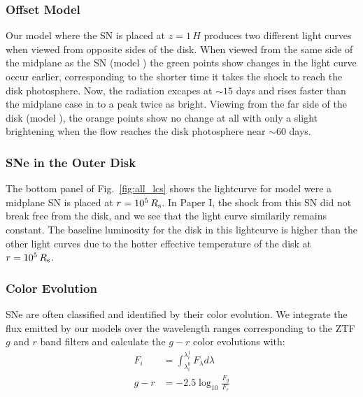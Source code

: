 \subsubsection{Offset Model}

Our model where the SN is placed at $z=1\,H$ produces two different light curves when viewed from opposite sides of the disk.
When viewed from the same side of the midplane as the SN (model ) the green points show changes in the light curve occur earlier, corresponding to the shorter time it takes the shock to reach the disk photosphere.
Now, the radiation excapes at $\sim15$ days and rises faster than the midplane case in  to a peak twice as bright.
Viewing from the far side of the disk (model ), the orange points show no change at all with only a slight brightening when the flow reaches the disk photosphere near $\sim60$ days.

\subsubsection{SNe in the Outer Disk}

The bottom panel of Fig.~\ref{fig:all_lcs} shows the lightcurve for model  were a midplane SN is placed at $r=10^5\,R_{\rm s}$.
In Paper I, the shock from this SN did not break free from the disk, and we see that the light curve similarily remains constant.
The baseline luminosity for the disk in this lightcurve is higher than the other light curves due to the hotter effective temperature of the disk at $r=10^5\,R_{\rm s}$. 



\subsubsection{Color Evolution}
SNe are often classified and identified by their color evolution.
We integrate the flux emitted by our models over the wavelength ranges corresponding to the ZTF $g$ and $r$ band filters and calculate the $g-r$ color evolutions with:
\begin{align}
	F_{i} &= \int_{\lambda_{i}^0} ^{\lambda_{i}^1} F_\lambda d\lambda \\
	g-r     &= -2.5\log_{10}\frac{F_g}{F_r}
\end{align}


